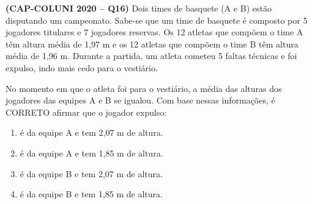 \textbf{(CAP-COLUNI 2020 -- Q16)} Dois times de basquete (A e B) estão disputando um campeonato. Sabe-se que um time de basquete é composto por 5 jogadores titulares e 7 jogadores reservas. Os 12 atletas que compõem o time A têm altura média de 1,97 m e os 12 atletas que compõem o time B têm altura média de 1,96 m. Durante a partida, um atleta cometeu 5 faltas técnicas e foi expulso, indo mais cedo para o vestiário.

No momento em que o atleta foi para o vestiário, a média das alturas dos jogadores das equipes A e B se igualou. Com base nessas informações, é CORRETO afirmar que o jogador expulso:

\begin{enumerate}
	\item é da equipe A e tem 2,07 m de altura.
	\item é da equipe A e tem 1,85 m de altura.
	\item é da equipe B e tem 2,07 m de altura.
	\item é da equipe B e tem 1,85 m de altura.
\end{enumerate}
